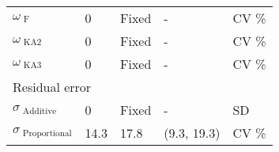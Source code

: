 \documentclass[varwidth, border={10 5 50 5}]{standalone}
\begin{document}
\begin{tabular}{l|l|l|l|l}
 $\omega_{\text{ F}}$                  & 0                & Fixed            & -                                    & CV \%           \\
 $\omega_{\text{ KA2}}$                & 0                & Fixed            & -                                    & CV \%           \\
 $\omega_{\text{ KA3}}$                & 0                & Fixed            & -                                    & CV \%           \\ \hline
\multicolumn{5}{l}{Residual error} \\ \hline
 $\sigma_{\text{ Additive}}$           & 0                & Fixed            & -                                    & SD               \\
 $\sigma_{\text{ Proportional}}$       & 14.3             & 17.8\           & (9.3, 19.3)                          & CV \%           \\ \hline
\end{tabular}
\end{document}
